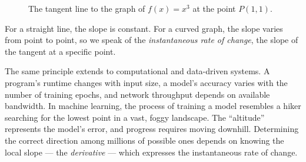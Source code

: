 \begin{figure}[htbp]
    \centering
    \caption{The tangent line to the graph of \(f(x)=x^3\) at the point \(P(1, 1)\).}
    \label{fig:ch10-tangent}
\end{figure}

\begin{remark}
For a straight line, the slope is constant. For a curved graph, the slope varies from point to point, so we speak of the \emph{instantaneous rate of change}, the slope of the tangent at a specific point.
\end{remark}

The same principle extends to computational and data-driven systems. A program’s runtime changes with input size, a model’s accuracy varies with the number of training epochs, and network throughput depends on available bandwidth. In machine learning, the process of training a model resembles a hiker searching for the lowest point in a vast, foggy landscape. The “altitude” represents the model’s error, and progress requires moving downhill. Determining the correct direction among millions of possible ones depends on knowing the local slope — the \emph{derivative} — which expresses the instantaneous rate of change.

